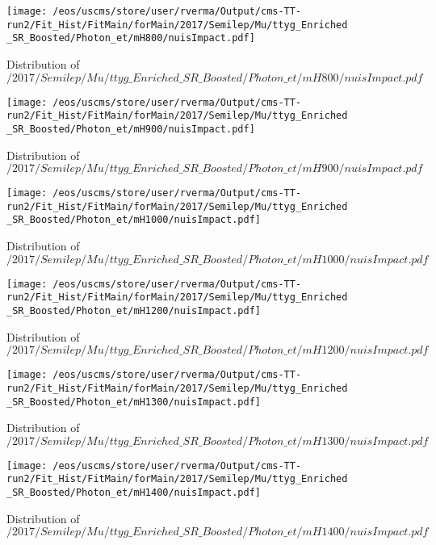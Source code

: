 \begin{figure}
\centering
\texttt{[image: /eos/uscms/store/user/rverma/Output/cms-TT-run2/Fit\_Hist/FitMain/forMain/2017/Semilep/Mu/ttyg\_Enriched\_SR\_Boosted/Photon\_et/mH800/nuisImpact.pdf]}
\caption{Distribution of $/2017/Semilep/Mu/ttyg\_Enriched\_SR\_Boosted/Photon\_et/mH800/nuisImpact.pdf$}
\end{figure}

\begin{figure}
\centering
\texttt{[image: /eos/uscms/store/user/rverma/Output/cms-TT-run2/Fit\_Hist/FitMain/forMain/2017/Semilep/Mu/ttyg\_Enriched\_SR\_Boosted/Photon\_et/mH900/nuisImpact.pdf]}
\caption{Distribution of $/2017/Semilep/Mu/ttyg\_Enriched\_SR\_Boosted/Photon\_et/mH900/nuisImpact.pdf$}
\end{figure}

\begin{figure}
\centering
\texttt{[image: /eos/uscms/store/user/rverma/Output/cms-TT-run2/Fit\_Hist/FitMain/forMain/2017/Semilep/Mu/ttyg\_Enriched\_SR\_Boosted/Photon\_et/mH1000/nuisImpact.pdf]}
\caption{Distribution of $/2017/Semilep/Mu/ttyg\_Enriched\_SR\_Boosted/Photon\_et/mH1000/nuisImpact.pdf$}
\end{figure}

\begin{figure}
\centering
\texttt{[image: /eos/uscms/store/user/rverma/Output/cms-TT-run2/Fit\_Hist/FitMain/forMain/2017/Semilep/Mu/ttyg\_Enriched\_SR\_Boosted/Photon\_et/mH1200/nuisImpact.pdf]}
\caption{Distribution of $/2017/Semilep/Mu/ttyg\_Enriched\_SR\_Boosted/Photon\_et/mH1200/nuisImpact.pdf$}
\end{figure}

\begin{figure}
\centering
\texttt{[image: /eos/uscms/store/user/rverma/Output/cms-TT-run2/Fit\_Hist/FitMain/forMain/2017/Semilep/Mu/ttyg\_Enriched\_SR\_Boosted/Photon\_et/mH1300/nuisImpact.pdf]}
\caption{Distribution of $/2017/Semilep/Mu/ttyg\_Enriched\_SR\_Boosted/Photon\_et/mH1300/nuisImpact.pdf$}
\end{figure}

\begin{figure}
\centering
\texttt{[image: /eos/uscms/store/user/rverma/Output/cms-TT-run2/Fit\_Hist/FitMain/forMain/2017/Semilep/Mu/ttyg\_Enriched\_SR\_Boosted/Photon\_et/mH1400/nuisImpact.pdf]}
\caption{Distribution of $/2017/Semilep/Mu/ttyg\_Enriched\_SR\_Boosted/Photon\_et/mH1400/nuisImpact.pdf$}
\end{figure}

